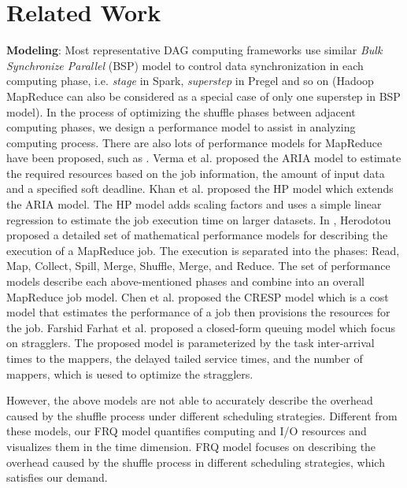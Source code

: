 \section{Related Work}

{\color{blue}
\textbf{Modeling}: Most representative DAG computing frameworks use similar \textit{Bulk Synchronize Parallel} (BSP)\cite{valiant1990bridging} model to control data synchronization in each computing phase, i.e. \textit{stage} in Spark, \textit{superstep} in Pregel\cite{malewicz2010pregel} and so on (Hadoop MapReduce can also be considered as a special case of only one superstep in BSP model). 
In the process of optimizing the shuffle phases between adjacent computing phases, we design a performance model to assist in analyzing computing process.
There are also lots of performance models for MapReduce have been proposed, such as \cite{verma2011aria, khan2016hadoop, herodotou2011hadoop, chen2014cresp, farhat2016stochastic}.
Verma et al. \cite{verma2011aria} proposed the ARIA model to estimate the required resources based on the job information, the amount of input data and a specified soft deadline.
Khan et al. \cite{khan2016hadoop} proposed the HP model which extends the ARIA model. The HP model adds scaling factors and uses a simple linear regression to estimate the job execution time on larger datasets.
In \cite{herodotou2011hadoop}, Herodotou proposed a detailed set of mathematical performance models for describing the execution of a MapReduce job. The execution is separated into the phases: Read, Map, Collect, Spill, Merge, Shuffle, Merge, and Reduce. The set of performance models describe each above-mentioned phases and combine into an overall MapReduce job model. 
Chen et al. \cite{chen2014cresp} proposed the CRESP model which is a cost model that estimates the performance of a job then 
provisions the resources for the job.
Farshid Farhat et al.\cite{farhat2016stochastic} proposed a closed-form queuing model which focus on stragglers. The proposed model is parameterized by the task inter-arrival times to the mappers, the delayed tailed service times, and the number of mappers, which is uesed to optimize the stragglers.


However, the above models are not able to accurately describe the overhead caused by the shuffle process under different scheduling strategies. 
Different from these models, our FRQ model quantifies computing and I/O resources and visualizes them in the time dimension. FRQ model focuses on describing the overhead caused by the shuffle process in different scheduling strategies, which satisfies our demand.
}

